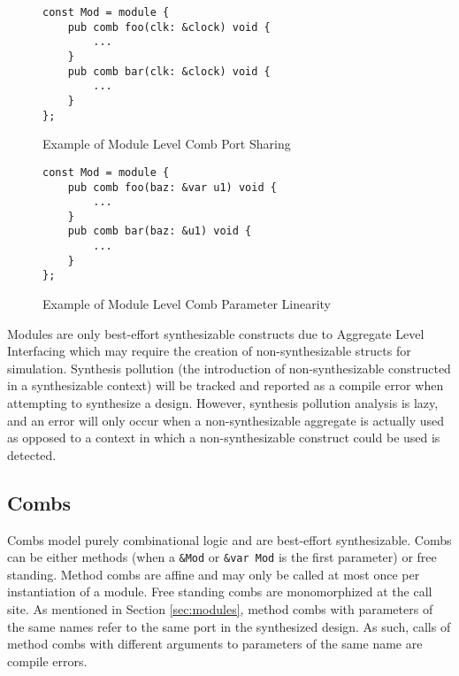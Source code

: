 \documentclass[10pt]{article}
\begin{document}
\begin{multicols}{2}
	\begin{figure}[H]
		\begin{verbatim}
const Mod = module {
    pub comb foo(clk: &clock) void {
        ...
    }
    pub comb bar(clk: &clock) void {
        ...
    }
};
    \end{verbatim}
		\vspace*{-10mm}
		\caption{Example of Module Level Comb Port Sharing}
		\label{fig:mod_comb_port_share}
	\end{figure}
	\columnbreak
	\begin{figure}[H]
		\begin{verbatim}
const Mod = module {
    pub comb foo(baz: &var u1) void {
        ...
    }
    pub comb bar(baz: &u1) void {
        ...
    }
};
    \end{verbatim}
		\vspace*{-10mm}
		\caption{Example of Module Level Comb Parameter Linearity}
		\label{fig:mod_comb_port_linearity}
	\end{figure}
\end{multicols}

\begin{mdframed}[frametitle=A Note on the Synthesizability of Modules]
	Modules are only best-effort synthesizable constructs due to Aggregate Level Interfacing which may
	require the creation of non-synthesizable structs for simulation. Synthesis pollution (the
	introduction of non-synthesizable constructed in a synthesizable context) will be tracked and
	reported as a compile error when attempting to synthesize a design. However, synthesis pollution
	analysis is lazy, and an error will only occur when a non-synthesizable aggregate is actually
	used as opposed to a context in which a non-synthesizable construct could be used is detected.
\end{mdframed}

\subsection{Combs}
Combs model purely combinational logic and are best-effort synthesizable. Combs can be either
methods (when a \verb|&Mod| or \verb|&var Mod| is the first parameter) or free standing. Method
combs are affine and may only be called at most once per instantiation of a module. Free standing
combs are monomorphized at the call site. As mentioned in Section \ref{sec:modules}, method combs
with parameters of the same names refer to the same port in the synthesized design. As such, calls
of method combs with different arguments to parameters of the same name are compile errors.
\end{document}
